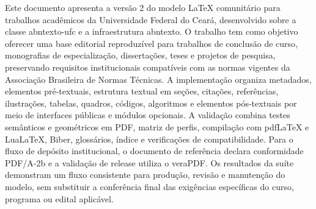 Este documento apresenta a versão 2 do modelo LaTeX comunitário para trabalhos acadêmicos da Universidade Federal do Ceará, desenvolvido sobre a classe abntexto-ufc e a infraestrutura abntexto. O trabalho tem como objetivo oferecer uma base editorial reproduzível para trabalhos de conclusão de curso, monografias de especialização, dissertações, teses e projetos de pesquisa, preservando requisitos institucionais compatíveis com as normas vigentes da Associação Brasileira de Normas Técnicas. A implementação organiza metadados, elementos pré-textuais, estrutura textual em seções, citações, referências, ilustrações, tabelas, quadros, códigos, algoritmos e elementos pós-textuais por meio de interfaces públicas e módulos opcionais. A validação combina testes semânticos e geométricos em PDF, matriz de perfis, compilação com pdfLaTeX e LuaLaTeX, Biber, glossários, índice e verificações de compatibilidade. Para o fluxo de depósito institucional, o documento de referência declara conformidade PDF/A-2b e a validação de release utiliza o veraPDF. Os resultados da suíte demonstram um fluxo consistente para produção, revisão e manutenção do modelo, sem substituir a conferência final das exigências específicas do curso, programa ou edital aplicável.

